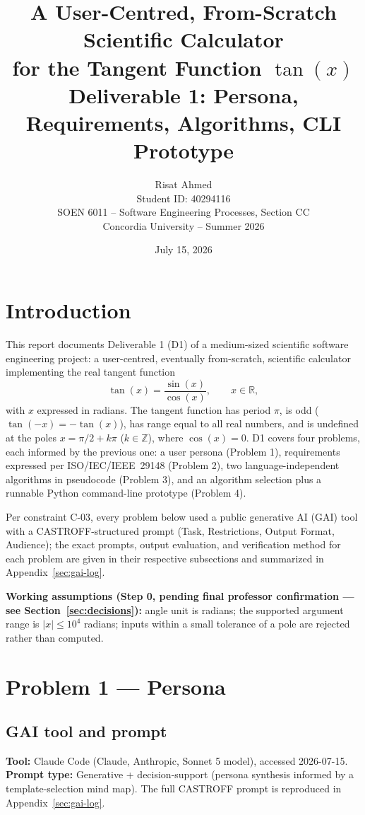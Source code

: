 \documentclass[11pt]{article}
\title{\textbf{A User-Centred, From-Scratch Scientific Calculator\\ for the Tangent Function $\tan(x)$}\\[0.3cm]
\large Deliverable 1: Persona, Requirements, Algorithms, CLI Prototype}
\author{Risat Ahmed \\ Student ID: 40294116 \\ SOEN 6011 -- Software Engineering Processes, Section CC \\ Concordia University -- Summer 2026}
\date{July 15, 2026}
\begin{document}
\maketitle
\thispagestyle{empty}
\newpage

\tableofcontents
\newpage

\section{Introduction}

This report documents Deliverable 1 (D1) of a medium-sized scientific software engineering project: a user-centred, eventually from-scratch, scientific calculator implementing the real tangent function
\[
\tan(x) = \frac{\sin(x)}{\cos(x)}, \qquad x \in \mathbb{R},
\]
with $x$ expressed in radians. The tangent function has period $\pi$, is odd ($\tan(-x) = -\tan(x)$), has range equal to all real numbers, and is undefined at the poles $x = \pi/2 + k\pi$ ($k \in \mathbb{Z}$), where $\cos(x) = 0$. D1 covers four problems, each informed by the previous one: a user persona (Problem 1), requirements expressed per ISO/IEC/IEEE~29148 (Problem 2), two language-independent algorithms in pseudocode (Problem 3), and an algorithm selection plus a runnable Python command-line prototype (Problem 4).

Per constraint C-03, every problem below used a public generative AI (GAI) tool with a CASTROFF-structured prompt (Task, Restrictions, Output Format, Audience); the exact prompts, output evaluation, and verification method for each problem are given in their respective subsections and summarized in Appendix~\ref{sec:gai-log}.

\textbf{Working assumptions (Step 0, pending final professor confirmation --- see Section~\ref{sec:decisions}):} angle unit is radians; the supported argument range is $|x| \le 10^4$ radians; inputs within a small tolerance of a pole are rejected rather than computed.

\section{Problem 1 --- Persona}

\subsection{GAI tool and prompt}
\textbf{Tool:} Claude Code (Claude, Anthropic, Sonnet 5 model), accessed 2026-07-15. \textbf{Prompt type:} Generative + decision-support (persona synthesis informed by a template-selection mind map). The full CASTROFF prompt is reproduced in Appendix~\ref{sec:gai-log}.
\end{document}
